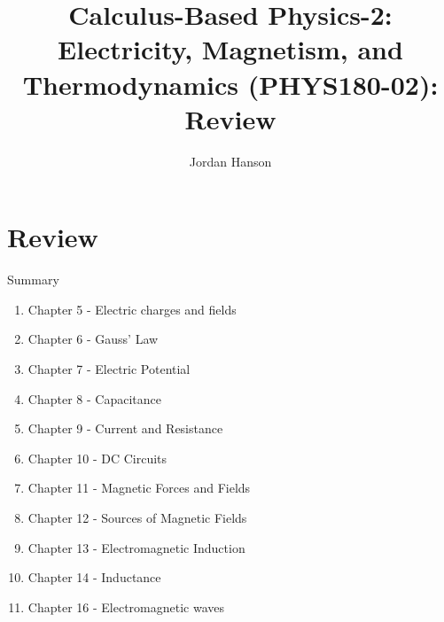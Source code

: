 \documentclass{beamer}
\title{Calculus-Based Physics-2: Electricity, Magnetism, and Thermodynamics (PHYS180-02): Review}
\author{Jordan Hanson}
\institute{Whittier College Department of Physics and Astronomy}
\begin{document}
\maketitle

\section{Review}

\begin{frame}{Summary}
\begin{enumerate}
\item Chapter 5 - Electric charges and fields
\item Chapter 6 - Gauss' Law
\item Chapter 7 - Electric Potential
\item Chapter 8 - Capacitance
\item Chapter 9 - Current and Resistance
\item Chapter 10 - DC Circuits
\item Chapter 11 - Magnetic Forces and Fields
\item Chapter 12 - Sources of Magnetic Fields
\item Chapter 13 - Electromagnetic Induction
\item Chapter 14 - Inductance
\item Chapter 16 - Electromagnetic waves
\end{enumerate}
\end{frame}
\end{document}
